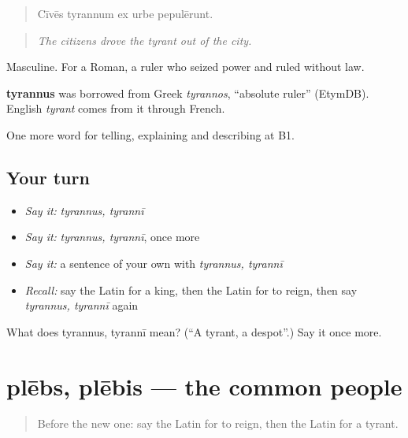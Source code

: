 \begin{quote}
Cīvēs tyrannum ex urbe pepulērunt.
\end{quote}

\begin{quote}
\emph{The citizens drove the tyrant out of the city.}
\end{quote}

Masculine. For a Roman, a ruler who seized power and ruled without law.

\begin{cousinweb}
\textbf{tyrannus} was borrowed from Greek \emph{tyrannos}, \textquotedblleft{}absolute ruler\textquotedblright{} (EtymDB). English \emph{tyrant} comes from it through French.
\end{cousinweb}

\begin{grammarlens}[title={What you've built}]
One more word for telling, explaining and describing at B1.
\end{grammarlens}

\subsection*{Your turn}
\begin{itemize}
\raggedright
  \item \emph{Say it:} \emph{tyrannus, tyrannī}
  \item \emph{Say it:} \emph{tyrannus, tyrannī}, once more
  \item \emph{Say it:} a sentence of your own with \emph{tyrannus, tyrannī}
  \item \emph{Recall:} say the Latin for a king, then the Latin for to reign, then say \emph{tyrannus, tyrannī} again
\end{itemize}

\begin{tcolorbox}[breakable,colback=teal!4,colframe=teal!35!black,title={Before you move on}]
What does tyrannus, tyrannī mean? (\textquotedblleft{}A tyrant, a despot\textquotedblright{}.) Say it once more.
\end{tcolorbox}
\section[plēbs, plēbis]{plēbs, plēbis — the common people}

\label{lesson:LA-C345-plebs}



\begin{quote}
Before the new one: say the Latin for to reign, then the Latin for a tyrant.
\end{quote}

